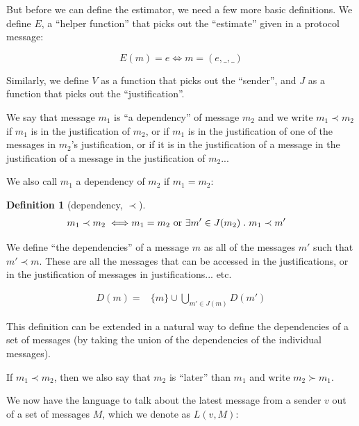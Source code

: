 \documentclass{article}
\theoremstyle{definition}
\newtheorem{defn}{Definition}[section]
\begin{document}
But before we can define the estimator, we need a few more basic definitions. We define $E$, a ``helper function'' that picks out the ``estimate'' given in a protocol message:

$$
E(m) = e \iff m = (e, \_, \_)
$$

Similarly, we define $V$ as a function that picks out the ``sender'', and $J$ as a function that picks out the ``justification''.

We say that message $m_1$ is ``a dependency'' of message $m_2$ and we write $m_1 \prec m_2$ if $m_1$ is in the justification of $m_2$, or if $m_1$ is in the justification of one of the messages in $m_2$'s justification, or if it is in the justification of a message in the justification of a message in the justification of $m_2$...

We also call $m_1$ a dependency of $m_2$ if $m_1 = m_2$:

\begin{defn}[dependency, $\prec$]
\begin{equation*}
\begin{split}
m_1 \prec m_2 \iff & m_1 = m_2 \text{ or } \exists m' \in J(m_2) \hspace{1mm} . \hspace{1mm} m_1 \prec m'
\end{split}
\end{equation*}
\end{defn}

We define ``the dependencies'' of a message $m$ as all of the messages $m'$ such that $m' \prec m$. These are all the messages that can be accessed in the justifications, or in the justification of messages in justifications... etc.

\begin{equation*}
\begin{split}
D(m) = &\{m\}\cup \bigcup_{m' \in J(m)} D(m')
\end{split}
\end{equation*}

This definition can be extended in a natural way to define the dependencies of a set of messages (by taking the union of the dependencies of the individual messages).

If $m_1 \prec m_2$, then we also say that $m_2$ is ``later'' than $m_1$ and write $m_2 \succ m_1$.

We now have the language to talk about the latest message from a sender $v$ out of a set of messages $M$, which we denote as $L(v, M)$:
\end{document}

